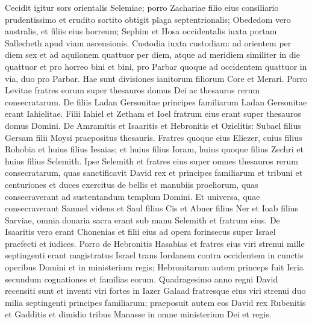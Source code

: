\begin{biblechapter}
\begin{biblechapter}
\begin{biblechapter}
\begin{biblechapter}
\begin{biblechapter}
\begin{biblechapter}
\begin{biblechapter}
\begin{biblechapter}
\begin{biblechapter}
\begin{biblechapter}
\begin{biblechapter}
\begin{biblechapter}
\begin{biblechapter}
\begin{biblechapter}
\begin{biblechapter}
\begin{biblechapter}
\begin{biblechapter}
\begin{biblechapter}
\begin{biblechapter}
\begin{biblechapter}
\begin{biblechapter}
\begin{biblechapter}
\begin{biblechapter}
\begin{biblechapter}
\begin{biblechapter}
\begin{biblechapter}
\verse Cecidit igitur sors orientalis Selemiae; porro Zachariae filio eius consiliario prudentissimo et erudito sortito obtigit plaga septentrionalis; 
\verse Obededom vero australis, et filiis eius horreum; 
\verse Sephim et Hosa occidentalis iuxta portam Sallecheth apud viam ascensionis. Custodia iuxta custodiam: 
\verse ad orientem per diem sex et ad aquilonem quattuor per diem, atque ad meridiem similiter in die quattuor et pro horreo bini et bini, 
\verse pro Parbar quoque ad occidentem quattuor in via, duo pro Parbar. 
\verse Hae sunt divisiones ianitorum filiorum Core et Merari.
 \verse Porro Levitae fratres eorum super thesauros domus Dei ac thesauros rerum consecratarum. 
\verse De filiis Ladan Gersonitae principes familiarum Ladan Gersonitae erant Iahielitae. 
\verse Filii Iahiel et Zetham et Ioel fratrum eius erant super thesauros domus Domini. 
\verse De Amramitis et Isaaritis et Hebronitis et Ozielitis: 
\verse Subael filius Gersam filii Moysi praepositus thesauris. 
\verse Fratres quoque eius Eliezer, cuius filius Rohobia et huius filius Iesaias; et huius filius Ioram, huius quoque filius Zechri et huius filius Selemith. 
\verse Ipse Selemith et fratres eius super omnes thesauros rerum consecratarum, quas sanctificavit David rex et principes familiarum et tribuni et centuriones et duces exercitus 
\verse de bellis et manubiis proeliorum, quas consecraverant ad sustentandum templum Domini. 
\verse Et universa, quae consecraverant Samuel videns et Saul filius Cis et Abner filius Ner et Ioab filius Sarviae, omnia donaria sacra erant sub manu Selemith et fratrum eius.
 \verse De Isaaritis vero erant Chonenias et filii eius ad opera forinsecus super Israel praefecti et iudices. 
\verse Porro de Hebronitis Hasabias et fratres eius viri strenui mille septingenti erant magistratus Israel trans Iordanem contra occidentem in cunctis operibus Domini et in ministerium regis; 
\verse Hebronitarum autem princeps fuit Ieria secundum cognationes et familias eorum. Quadragesimo anno regni David recensiti sunt et inventi viri fortes in Iazer Galaad 
\verse fratresque eius viri strenui duo milia septingenti principes familiarum; praeposuit autem eos David rex Rubenitis et Gadditis et dimidio tribus Manasse in omne ministerium Dei et regis.
 

\end{biblechapter}
\end{biblechapter}
\end{biblechapter}
\end{biblechapter}
\end{biblechapter}
\end{biblechapter}
\end{biblechapter}
\end{biblechapter}
\end{biblechapter}
\end{biblechapter}
\end{biblechapter}
\end{biblechapter}
\end{biblechapter}
\end{biblechapter}
\end{biblechapter}
\end{biblechapter}
\end{biblechapter}
\end{biblechapter}
\end{biblechapter}
\end{biblechapter}
\end{biblechapter}
\end{biblechapter}
\end{biblechapter}
\end{biblechapter}
\end{biblechapter}
\end{biblechapter}
